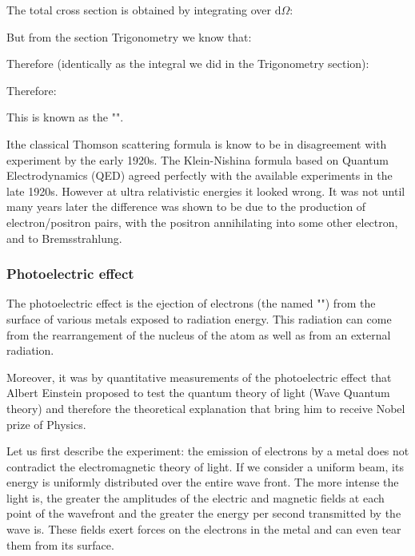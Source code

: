 	The total cross section is obtained by integrating over $\mathrm{d}\Omega$:
	
	But from the section Trigonometry we know that:
	
	Therefore (identically as the integral we did in the Trigonometry section):
	
	Therefore:
		
	This is known as the "".
	
	Ithe classical Thomson scattering formula is know to be in disagreement with experiment by the early 1920s. The Klein-Nishina formula based on Quantum Electrodynamics (QED) agreed perfectly with the available experiments in the late 1920s. However at ultra relativistic energies it looked wrong. It was not until many years later the difference was shown to be due to the production of electron/positron pairs, with the positron annihilating into some other electron, and to Bremsstrahlung.
	
	\subsubsection{Photoelectric effect}\label{photoelectric effect}
	The photoelectric effect is the ejection of electrons (the named "") from the surface of various metals exposed to radiation energy. This radiation can come from the rearrangement of the nucleus of the atom as well as from an external radiation.

	Moreover, it was by quantitative measurements of the photoelectric effect that Albert Einstein proposed to test the quantum theory of light (Wave Quantum theory) and therefore the theoretical explanation that bring him to receive Nobel prize of Physics.

	Let us first describe the experiment: the emission of electrons by a metal does not contradict the electromagnetic theory of light. If we consider a uniform beam, its energy is uniformly distributed over the entire wave front. The more intense the light is, the greater the amplitudes of the electric and magnetic fields at each point of the wavefront and the greater the energy per second transmitted by the wave is. These fields exert forces on the electrons in the metal and can even tear them from its surface.

